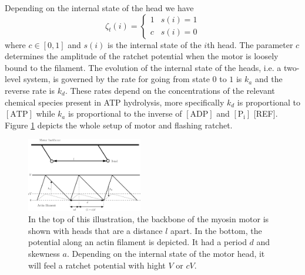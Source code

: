 \documentclass[aps,pre,twocolumn,showpacs,showkeys,a4paper]{revtex4}
\begin{document}
Depending on the internal state of the head we have 
\begin{equation}
\zeta_t(i) =  \begin{cases} 
      1 & s(i) = 1\\
      c & s(i) = 0
   \end{cases}
\end{equation}
where $c\in\left[0,1\right]$ and $s(i)$ is the internal state of the $i$th head. 
The parameter $c$ determines the amplitude of the ratchet potential when the motor is loosely bound to the filament. 
The evolution of the internal state of the heads, i.e. a two-level system, is governed by the rate for going from state $0$ to $1$ is $k_{a}$ and the reverse rate is $k_{d}$.
These rates depend on the concentrations of the relevant chemical species present in ATP hydrolysis, more specifically $k_{d}$ is proportional to $[\text{ATP}]$ while $k_{a}$ is proportional to the inverse of $[\text{ADP}]$ and $[\text{P}_\text{i}]$ [REF]. 
Figure \ref{Fig: ratchet setup} depicts the whole setup of motor and flashing ratchet. 
\begin{figure}[t]
\centering
\includegraphics[width=0.45\textwidth,height=!]{ratchet_illustration}
\caption{In the top of this illustration, the backbone of the myosin motor is shown with heads that are a distance $l$ apart. 
In the bottom, the potential along an actin filament is depicted. 
It had a period $d$ and skewness $a$. 
Depending on the internal state of the motor head, it will feel a ratchet potential with hight $V$ or $cV$.} 
\label{Fig: ratchet setup}
\end{figure}
\end{document}

